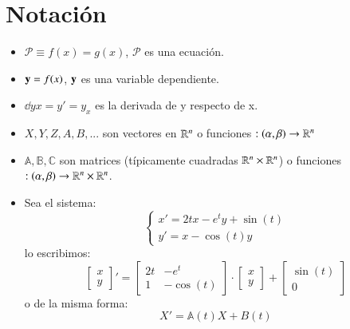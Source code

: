
\chapter{Notaci\'{o}n}
\begin{multicols}{2}
    \begin{itemize}
        \item $ \mathcal{P} \equiv f(x) = g(x)$, $\mathcal{P}$ es una ecuación.
        \item $\mathbf{y} = f(x)$, $\mathbf{y}$ es una variable dependiente.
        \item $\dd{y}{x} = y' = y_x$ es la derivada de y respecto de x.
        \item $X, Y, Z, A, B, ...$ son vectores en $\mathbb{R}^n$ o funciones $:(\alpha, \beta) \to \mathbb{R}^n$
        \item $\mathbb{A}, \mathbb{B}, \mathbb{C}$ son matrices (típicamente cuadradas $\mathbb{R}^n \times \mathbb{R}^n$) o funciones $:(\alpha, \beta) \to \mathbb{R}^n \times \mathbb{R}^n$.
        \item Sea el sistema:
        $$
            \begin{cases}
                x' = 2tx - e^ty + \sin(t)\\
                y' = x - \cos(t) y
            \end{cases}
        $$
        lo escribimos:
        $$
            \left[
            \begin{matrix}
                x\\
                y
            \end{matrix}\right]' =
            \left[
            \begin{matrix}
                2t & -e^t\\
                1 & -\cos(t)
            \end{matrix}\right] \cdot
            \left[
            \begin{matrix}
                x\\
                y
            \end{matrix}
            \right]
            +
            \left[
            \begin{matrix}
                \sin(t)\\
                0
            \end{matrix}
            \right]
        $$
        o de la misma forma:
        $$
        X' = \mathbb{A}(t) X + B(t)
        $$
    \end{itemize}
\end{multicols}

